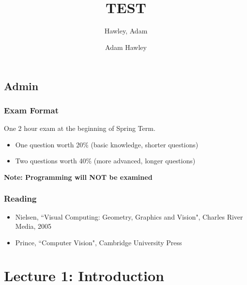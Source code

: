 \documentclass{article}\author{Hawley, Adam}
\author{Adam Hawley}
\title{TEST}
\begin{document}
\tableofcontents
\maketitle{}
\subsection{Admin}
\subsubsection{Exam Format}
One 2 hour exam at the beginning of Spring Term.
\begin{itemize}
\item One question worth 20\% (basic knowledge, shorter questions)
\item Two questions worth 40\% (more advanced, longer questions)
\end{itemize}
{\bf Note: Programming will NOT be examined}
\subsubsection{Reading}
\begin{itemize}
	\item Nielsen, ``Visual Computing: Geometry, Graphics and Vision", Charles River Media, 2005
	\item Prince, ``Computer Vision", Cambridge University Press
\end{itemize}

\maketitle
\section{Lecture 1: Introduction}
\tableofcontents
\newpage
\end{document}
